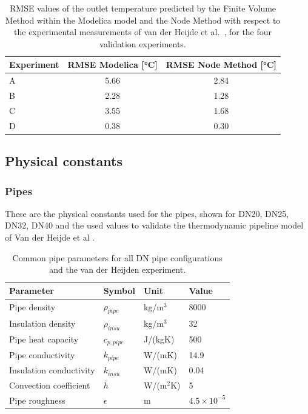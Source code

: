 \begin{table}[h!]
\centering
\caption{RMSE values of the outlet temperature predicted by the Finite Volume 
Method within the Modelica model and the Node Method with respect to the 
experimental measurements of van der Heijde et al.\ \cite{VANDERHEIJDE2017158}, 
for the four validation experiments.}
\label{tab::pipe_validation_rmse}
\begin{tabular}{lcc}
\hline
\textbf{Experiment} & \textbf{RMSE Modelica [°C]} & \textbf{RMSE Node Method [°C]} \\
\hline
A & 5.66 & 2.84 \\
B & 2.28 & 1.28 \\
C & 3.55 & 1.68 \\
D & 0.38 & 0.30 \\
\hline
\end{tabular}
\end{table}



\clearpage
\subsection{Physical constants}\label{sec::physicalConstants}


\subsubsection{Pipes}
These are the physical constants used for the pipes, shown for DN20, DN25, DN32, DN40 and the used values to validate the thermodynamic pipeline model of Van der Heijde et al \cite{VANDERHEIJDE2017158}. 

\begin{table}[h!]
\centering
\caption{Common pipe parameters for all DN pipe configurations and the van der Heijden experiment.}
\label{tab:pipe_dn_common}
\begin{tabular}{llll}
\hline
\textbf{Parameter} & \textbf{Symbol} & \textbf{Unit} & \textbf{Value} \\
\hline
Pipe density            & $\rho_{pipe}$   & kg/m$^3$          & 8000                 \\
Insulation density      & $\rho_{insu}$   & kg/m$^3$          & 32                   \\
Pipe heat capacity      & $c_{p,pipe}$    & J/(kgK)           & 500                  \\
Pipe conductivity       & $k_{pipe}$      & W/(mK)            & 14.9                 \\
Insulation conductivity & $k_{insu}$      & W/(mK)            & 0.04                 \\
Convection coefficient  & $\bar{h}$       & W/(m$^2$K)        & 5                    \\
Pipe roughness          & $\epsilon$      & m                 & $4.5 \times 10^{-5}$ \\
\hline
\end{tabular}
\end{table}

